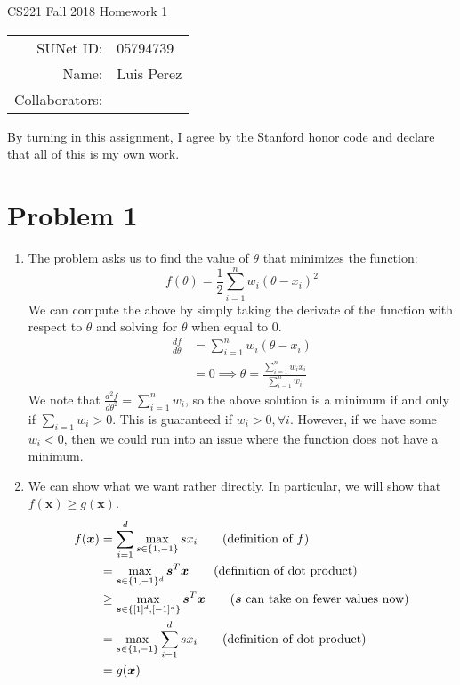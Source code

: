 \documentclass[12pt]{article}
\begin{document}
\begin{center}
{\Large CS221 Fall 2018 Homework 1}

\begin{tabular}{rl}
SUNet ID: & 05794739 \\
Name: & Luis Perez \\
Collaborators: &
\end{tabular}
\end{center}

By turning in this assignment, I agree by the Stanford honor code and declare
that all of this is my own work.

\section*{Problem 1}

\begin{enumerate}[label=(\alph*)]
  \item The problem asks us to find the value of $\theta$ that minimizes the function:
  $$
    f(\theta) = \frac{1}{2}\sum_{i=1}^n w_i(\theta - x_i)^2
  $$
  We can compute the above by simply taking the derivate of the function with respect to $\theta$ and solving for $\theta$ when equal to 0.
  \begin{align*}
    \frac{df}{d\theta} &= \sum_{i=1}^n w_i(\theta - x_i) \tag{using product rule $(uv)' = u'v + uv'$}\\ 
    &= 0 
    \implies \theta = \frac{\sum_{i=1}^n w_ix_i}{\sum_{i=1}^n w_i}
  \end{align*}
  We note that $\frac{d^2f}{d\theta^2} = \sum_{i=1}^n w_i$, so the above solution is a minimum if and only if $\sum_{i=1} w_i > 0$. This is guaranteed if $w_i > 0, \forall i$. However, if we have some $w_i < 0$, then we could run into an issue where the function does not have a minimum.

  \item We can show what we want rather directly. In particular, we will show that $f(\bm{x}) \geq g(\bm{x})$.
  \begin{align*}
    f(\bm{x}) &= \sum_{i=1}^d \max_{s \in \{1,-1\}} sx_i \tag{definition of $f$} \\
    &= \max_{\bm{s} \in \{1,-1\}^d} \bm{s}^T\bm{x} \tag{definition of dot product} \\
    &\geq \max_{\bm{s} \in \{[1]^d , [-1]^d\}} \bm{s}^T\bm{x} \tag{$\bm{s}$ can take on fewer values now} \\
    &= \max_{s \in \{1, -1\}} \sum_{i=1}^d sx_i \tag{definition of dot product} \\
    &= g(\bm{x})
  \end{align*}


\end{enumerate}
\end{document}
